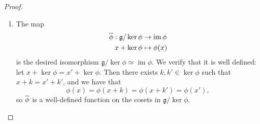 \documentclass{article}
\DeclareMathOperator{\im}{im}
\newcommand*\frkg{{\ensuremath{\mathfrak{g}}}}
\begin{document}
\begin{proof}
    \begin{enumerate}[label=(\alph*)]
        \item 
            The map
            \begin{align*}
                \barphi:
                \frkg/\ker\phi
                &\to
                \im \phi
                \\
                x + \ker \phi
                &\mapsto
                \phi(x)
            \end{align*}
            is the desired isomorphism $\frkg / \ker \phi \simeq \im \phi$.
            We verify that it is well defined: let $x + \ker \phi = x' + \ker \phi$.
            Then there exists $k, k' \in \ker \phi$ such that $x + k = x' + k'$, and we have that
            \[
                \phi(x)
                =
                \phi(x + k)
                =
                \phi(x + k')
                =
                \phi(x'),
            \]
            so $\overline{\phi}$ is a well-defined function on the cosets in $\frkg / \ker \phi$.


\end{enumerate}
\end{proof}
\end{document}
